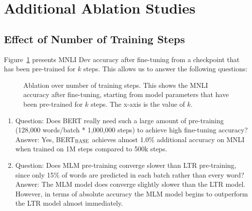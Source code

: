 \documentclass[11pt,a4paper]{article}
\newcommand\bertbase{BERT$_{\small \textsc{BASE}}$\xspace}
\begin{document}

\section{Additional Ablation Studies}
\label{appendix:sec:more_ablation_studies}

\subsection{Effect of Number of Training Steps}
\label{sec:num_training_steps}

Figure~\ref{fig:step_abalation} presents MNLI Dev accuracy after fine-tuning from a checkpoint that has been pre-trained for $k$ steps. This allows us to answer the following questions:


\begin{figure}[b]
\caption{Ablation over number of training steps. This shows the MNLI accuracy after fine-tuning, starting from model parameters that have been pre-trained for $k$ steps. The x-axis is the value of $k$.}
\label{fig:step_abalation}
\end{figure}

\begin{enumerate}
\item Question: Does BERT really need such a large amount of pre-training (128,000 words/batch * 1,000,000 steps) to achieve high fine-tuning accuracy? \\
Answer: Yes, \bertbase achieves almost 1.0\% additional accuracy on MNLI when trained on 1M steps compared to 500k steps.
\item Question: Does MLM pre-training converge slower than LTR pre-training, since only 15\% of words are predicted in each batch rather than every word? \\
Answer: The MLM model does converge slightly slower than the LTR model. However, in terms of absolute accuracy the MLM model begins to outperform the LTR model almost immediately.
\end{enumerate}
\end{document}
